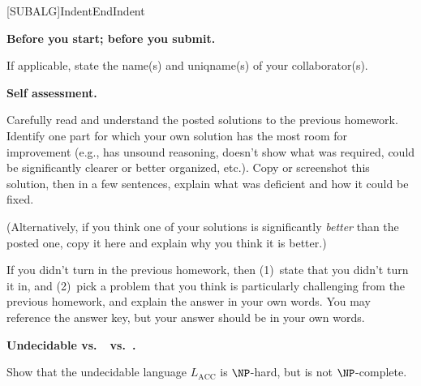 \documentclass[11pt,addpoints]{exam}
\newcommand{\NPcomplete}{\NP\text{-complete}}
\newcommand{\NPhard}{\NP\text{-hard}}
\begin{document}
\hwpreface

\pointsinmargin
{}
\marginpointname{ \points}
\marginbonuspointname{ \bonuspoints}

\newcommand{\atm}{L_{\text{ACC}}}

\newcommand{\OPT}{\textsf{OPT}}

[SUBALG]{Indent}{EndIndent}{}{\algorithmicend\ }%

\begin{questions}
  \addtocounter{question}{-1}

  \question[0] \textbf{Before you start; before you submit.}
  
    If applicable, state the name(s) and uniqname(s) of your collaborator(s).

    \begin{solution}
    
    \end{solution}

  \question[10] \textbf{Self assessment.}
  
  Carefully read and understand the posted solutions to the previous homework.
  Identify one part for which your own solution has the most room for improvement (e.g., has unsound reasoning, doesn’t show what was required, could be significantly clearer or better organized, etc.).
  Copy or screenshot this solution, then in a few sentences, explain what was deficient and how it could be fixed.

  (Alternatively, if you think one of your solutions is significantly \emph{better} than the posted one, copy it here and explain why you think it is better.)

  If you didn't turn in the previous homework, then (1)~state that you didn't turn it in, and (2)~pick a problem that you think is particularly challenging from the previous homework, and explain the answer in your own words.
  You may reference the answer key, but your answer should be in your own words.

  \begin{solution}

  \end{solution}
  
  \question[12] \textbf{Undecidable vs.\ \NPhard\ vs.\ \NPcomplete.}
  
  Show that the undecidable language $\atm$ is $\NP$-hard, but is not $\NP$-complete.
   

\end{questions}
\end{document}
